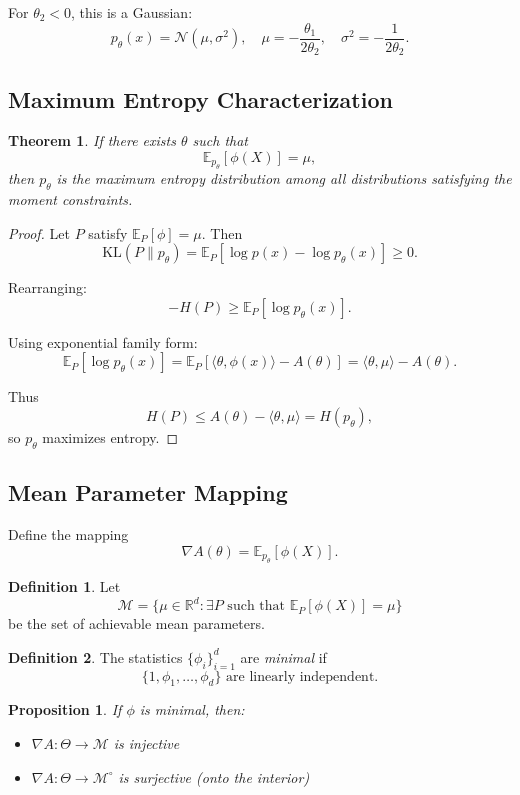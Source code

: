 \documentclass[12pt,oneside]{book}
\numberwithin{equation}{section}
\theoremstyle{definition}
\newtheorem{definition}{Definition}[section]
\theoremstyle{plain}
\newtheorem{theorem}{Theorem}[section]
\newtheorem{proposition}{Proposition}[section]
\theoremstyle{remark}
\newcommand{\R}{\mathbb{R}}
\newcommand{\E}{\mathbb{E}}
\newcommand{\Normal}{\mathcal{N}}
\begin{document}
For $\theta_2 < 0$, this is a Gaussian:
\[
p_\theta(x) = \Normal(\mu,\sigma^2),
\quad
\mu = -\frac{\theta_1}{2\theta_2},
\quad
\sigma^2 = -\frac{1}{2\theta_2}.
\]


\subsection{Maximum Entropy Characterization}

\begin{theorem}
If there exists $\theta$ such that
\[
\E_{p_\theta}[\phi(X)] = \mu,
\]
then $p_\theta$ is the maximum entropy distribution among all distributions satisfying the moment constraints.
\end{theorem}

\begin{proof}
Let $P$ satisfy $\E_P[\phi]=\mu$. Then
\[
\mathrm{KL}(P \| p_\theta)
=
\E_P[\log p(x) - \log p_\theta(x)] \ge 0.
\]

Rearranging:
\[
-H(P) \ge \E_P[\log p_\theta(x)].
\]

Using exponential family form:
\[
\E_P[\log p_\theta(x)]
=
\E_P[\langle \theta,\phi(x)\rangle - A(\theta)]
=
\langle \theta, \mu\rangle - A(\theta).
\]

Thus
\[
H(P)
\le
A(\theta) - \langle \theta,\mu\rangle
=
H(p_\theta),
\]
so $p_\theta$ maximizes entropy.
\end{proof}


\subsection{Mean Parameter Mapping}

Define the mapping
\[
\nabla A(\theta) = \E_{p_\theta}[\phi(X)].
\]

\begin{definition}
Let
\[
\mathcal{M}
=
\{\mu \in \R^d : \exists P \text{ such that } \E_P[\phi(X)] = \mu\}
\]
be the set of achievable mean parameters.
\end{definition}

\begin{definition}
The statistics $\{\phi_i\}_{i=1}^d$ are \emph{minimal} if
\[
\{1,\phi_1,\dots,\phi_d\}
\text{ are linearly independent}.
\]
\end{definition}

\begin{proposition}
If $\phi$ is minimal, then:
\begin{itemize}
\item $\nabla A : \Theta \to \mathcal{M}$ is injective
\item $\nabla A : \Theta \to \mathcal{M}^\circ$ is surjective (onto the interior)
\end{itemize}
\end{proposition}
\end{document}
